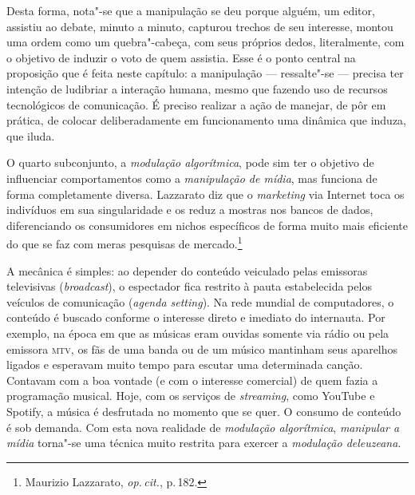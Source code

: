 Desta forma, nota"-se que a manipulação se deu porque alguém, um editor,
assistiu ao debate, minuto a minuto, capturou trechos de seu interesse,
montou uma ordem como um quebra"-cabeça, com seus próprios dedos,
literalmente, com o objetivo de induzir o voto de quem assistia. Esse é
o ponto central na proposição que é feita neste capítulo: a manipulação
--- ressalte"-se --- precisa ter intenção de ludibriar a interação humana,
mesmo que fazendo uso de recursos tecnológicos de comunicação. É preciso
realizar a ação de manejar, de pôr em prática, de colocar
deliberadamente em funcionamento uma dinâmica que induza, que iluda.

O quarto subconjunto, a \textit{modulação algorítmica}, pode sim ter o
objetivo de influenciar comportamentos como a \textit{manipulação de
mídia}, mas funciona de forma completamente diversa. Lazzarato diz que o
\textit{marketing} via Internet toca os indivíduos em sua singularidade e
os reduz a mostras nos bancos de dados, diferenciando os consumidores em
nichos específicos de forma muito mais eficiente do que se faz com meras
pesquisas de mercado.\footnote{Maurizio Lazzarato, \textit{op.\,cit.}, p.\,182.}

A mecânica é simples: ao depender do conteúdo veiculado pelas emissoras
televisivas (\textit{broadcast}), o espectador fica restrito à pauta
estabelecida pelos veículos de comunicação (\textit{agenda setting}). Na
rede mundial de computadores, o conteúdo é buscado conforme o interesse
direto e imediato do internauta. Por exemplo, na época em que as músicas
eram ouvidas somente via rádio ou pela emissora \textsc{mtv}, os fãs de uma banda
ou de um músico mantinham seus aparelhos ligados e esperavam muito tempo
para escutar uma determinada canção. Contavam com a boa vontade (e com o
interesse comercial) de quem fazia a programação musical. Hoje, com os
serviços de \textit{streaming}, como YouTube e Spotify, a música é
desfrutada no momento que se quer. O consumo de conteúdo é sob demanda.
Com esta nova realidade de \textit{modulação algorítmica}, \textit{manipular
a mídia} torna"-se uma técnica muito restrita para exercer a
\textit{modulação deleuzeana}.

